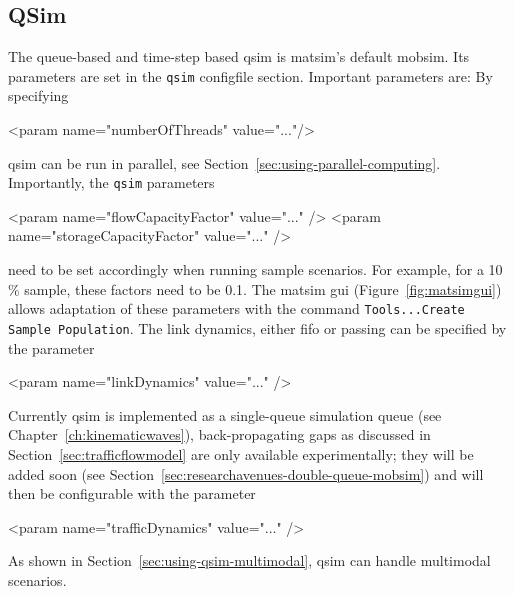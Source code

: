 \subsection{QSim}
\label{sec:using-qsim}
The queue-based and time-step based \gls{qsim} \citep[][]{Gawron_IJMPC_1998,SimonEtAl_IJMPC_1999,CetinBurriNagel2003queue,Dobler_TechRep_IVT_2011, Dobler_STRC_2010} is \gls{matsim}'s default \gls{mobsim}. 
Its parameters are set in the \lstinline|qsim| \gls{configfile} section. Important parameters are:
By specifying
\begin{xml}
   <param name="numberOfThreads" value="..."/>
\end{xml}
\gls{qsim} can be run in parallel, see Section~\ref{sec:using-parallel-computing}. 
%
Importantly, the \lstinline{qsim} parameters
\begin{xml}
    <param name="flowCapacityFactor" value="..." />
    <param name="storageCapacityFactor" value="..." />
\end{xml}
need to be set accordingly when running sample scenarios. For example, for a 10\,\% sample, these factors need to be 0.1. The \gls{matsim} \gls{gui} (Figure~\ref{fig:matsimgui}) allows adaptation of these parameters with the command \lstinline|Tools...Create Sample Population|.
%
The link dynamics, either \gls{fifo} or passing can be specified by the parameter 
\begin{xml}
   <param name="linkDynamics" value="..." />
\end{xml}
%
Currently \gls{qsim} is implemented as a single-queue simulation queue (see Chapter~\ref{ch:kinematicwaves}), \ie back-propagating gaps as discussed in Section~\ref{sec:trafficflowmodel} are only available experimentally; 
they will be added soon (see Section~\ref{sec:researchavenues-double-queue-mobsim}) and will then be configurable with the parameter
\begin{xml}
   <param name="trafficDynamics" value="..." />
\end{xml}
%
As shown in Section~\ref{sec:using-qsim-multimodal}, \gls{qsim} can handle \gls{multimodal} scenarios. %

